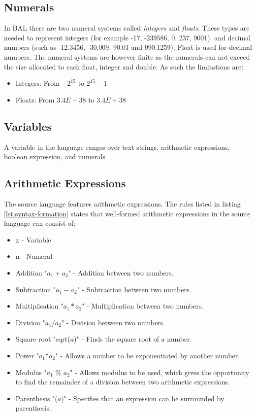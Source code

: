 \subsection{Numerals}
In BAL there are two numeral systems called \textit{integers} and \textit{floats}. These types are needed to represent integers (for example -17, -239586, 0, 237, 9001). and decimal numbers (such as -12.3456, -30.009, 90.01 and 990.1259). Float is used for decimal numbers. The numeral systems are however finite as the numerals can not exceed the size allocated to each float, integer and double. As such the limitations are:
\begin{itemize}
\item Integers: From $-2^{15}$ to $2^{15}-1$
\item Floats: From $3.4E-38$ to $3.4E+38$
\end{itemize}

\subsection{Variables}
A variable in the language ranges over text strings, arithmetic expressions, boolean expression, and numerals


\subsection{Arithmetic Expressions}
The source language features arithmetic expressions. The rules listed in listing \ref{lst:syntax-formation} states that well-formed arithmetic expressions in the source language can consist of:
\begin{itemize}
	\item x - Variable
	\item n - Numeral
	\item Addition "$a_1 + a_2$" - Addition between two numbers.
	\item Subtraction "$a_1 - a_2$" - Subtraction between two numbers.
	\item Multiplication "$a_1 * a_2$" - Multiplication between two numbers.
	\item Division "$a_1 / a_2$" - Division between two numbers.
	\item Square root "sqrt($a$)" - Finds the square root of a number.
	\item Power "$a_1$\texttt{\^{}}$a_2$" - Allows a number to be exponentiated by another number.
	\item Modulus "$a_1$ \% $a_2$" - Allows modulus to be used, which gives the opportunity to find the remainder of a division between two arithmetic expressions.
	\item Parenthesis "($a$)" - Specifies that an expression can be surrounded by parenthesis.
\end{itemize}

